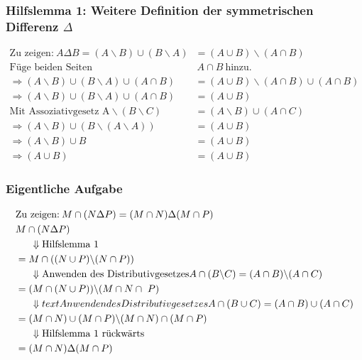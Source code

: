 \documentclass{article}
\begin{document}
            \subsubsection*{Hilfslemma 1: Weitere Definition der symmetrischen Differenz \( \Delta \)}
                \begin{lemma}
                    \begin{align*}
                        \text{Zu zeigen:} \: A \Delta B = (A \backslash B) \cup (B \backslash A) &= (A \cup B) \backslash (A \cap B) \\
                        \text{Füge beiden Seiten} &\: A \cap B \: \text{hinzu.} \\
                        \Rightarrow (A \backslash B ) \cup ( B \backslash A ) \cup ( A \cap B ) &= ( A \cup B ) \backslash ( A \cap B ) \cup ( A \cap B ) \\
                        \Rightarrow (A \backslash B ) \cup ( B \backslash A ) \cup ( A \cap B ) &= (A \cup B) \\
                        \text{Mit Assoziativgesetz A} \backslash (B \backslash C) &= (A \backslash B) \cup (A \cap C) \\
                        \Rightarrow (A \backslash B ) \cup ( B \backslash (A \backslash A) ) &= (A \cup B) \\
                        \Rightarrow (A \backslash B ) \cup B &= (A \cup B) \\
                        \Rightarrow (A \cup B) &= (A \cup B)
                    \end{align*}
                \end{lemma}

            \subsubsection*{Eigentliche Aufgabe}
                \begin{align*}
                    &\text{Zu zeigen:} \: M \cap (N \Delta P) = (M \cap N) \Delta (M \cap P) \\
                    &M \cap (N \Delta P) \\
                    &\indent \Downarrow \text{Hilfslemma 1} \\
                    &= M \cap ((N \cup P) \backslash (N \cap P)) \\
                    &\indent \Downarrow \text{Anwenden des Distributivgesetzes} A \cap (B \backslash C) = (A \cap B ) \backslash (A \cap C) \\
                    &= (M \cap (N \cup P)) \backslash (M \cap N \cap \ P) \\
                    &\indent \Downarrow text{Anwenden des Distributivgesetzes} A \cap (B \cup C) = (A \cap B ) \cup (A \cap C) \\
                    &=(M \cap N) \cup (M \cap P) \backslash (M \cap N) \cap (M \cap P)\\
                    &\indent \Downarrow \text{Hilfslemma 1 rückwärts}\\
                    &=(M \cap N) \Delta (M \cap P)
                \end{align*}
    
\end{document}
